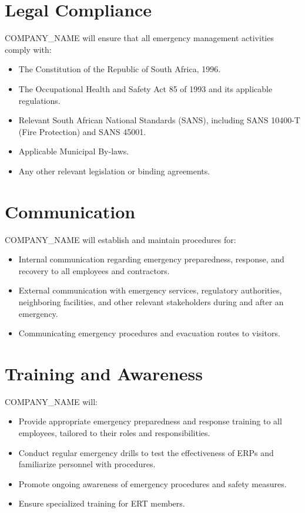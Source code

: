 \documentclass[12pt]{article}
\begin{document}
\section{Legal Compliance}
{{COMPANY_NAME}} will ensure that all emergency management activities comply with:
\begin{itemize}
    \item The Constitution of the Republic of South Africa, 1996.
    \item The Occupational Health and Safety Act 85 of 1993 and its applicable regulations.
    \item Relevant South African National Standards (SANS), including SANS 10400-T (Fire Protection) and SANS 45001.
    \item Applicable Municipal By-laws.
    \item Any other relevant legislation or binding agreements.
\end{itemize}

\section{Communication}
{{COMPANY_NAME}} will establish and maintain procedures for:
\begin{itemize}
    \item Internal communication regarding emergency preparedness, response, and recovery to all employees and contractors.
    \item External communication with emergency services, regulatory authorities, neighboring facilities, and other relevant stakeholders during and after an emergency.
    \item Communicating emergency procedures and evacuation routes to visitors.
\end{itemize}

\section{Training and Awareness}
{{COMPANY_NAME}} will:
\begin{itemize}
    \item Provide appropriate emergency preparedness and response training to all employees, tailored to their roles and responsibilities.
    \item Conduct regular emergency drills to test the effectiveness of ERPs and familiarize personnel with procedures.
    \item Promote ongoing awareness of emergency procedures and safety measures.
    \item Ensure specialized training for ERT members.
\end{itemize}
\end{document}
